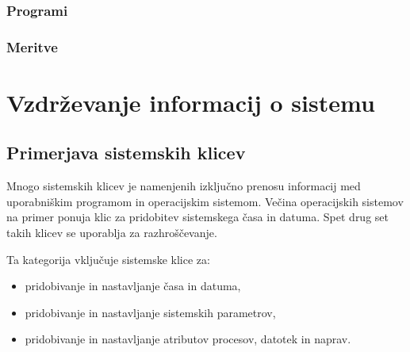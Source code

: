 \documentclass[a4paper,12pt,openright]{book}
\begin{document}
\subsection{Programi}

\subsection{Meritve}

\chapter{Vzdrževanje informacij o sistemu}

\section{Primerjava sistemskih klicev}

Mnogo sistemskih klicev je namenjenih izključno prenosu informacij med uporabniškim programom in operacijskim sistemom.
Večina operacijskih sistemov na primer ponuja klic za pridobitev sistemskega časa in datuma.
Spet drug set takih klicev se uporablja za razhroščevanje.

Ta kategorija vključuje sistemske klice za:
\begin{itemize}
	\item pridobivanje in nastavljanje časa in datuma,
	\item pridobivanje in nastavljanje sistemskih parametrov,
	\item pridobivanje in nastavljanje atributov procesov, datotek in naprav.\cite{Silberschatz_Galvin_Gagne_2018}
\end{itemize}
\end{document}
